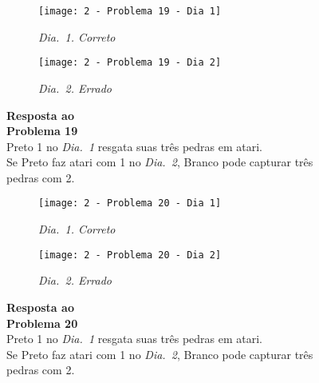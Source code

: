 \begin{SCfigure}[][h!]
    \begin{subfigure}[t]{.31\textwidth}
        \texttt{[image: 2 - Problema 19 - Dia 1]}
        \caption*{\emph{Dia.\@~1. Correto}}
    \end{subfigure}
    \hfill
    \begin{subfigure}[t]{.31\textwidth}
        \texttt{[image: 2 - Problema 19 - Dia 2]}
        \caption*{\emph{Dia.\@~2. Errado}}
    \end{subfigure}
    \hfill
    \caption*{\textbf{Resposta ao\\Problema 19}\\\vspace*{.25cm}Preto 1 no \emph{Dia.\@~1} resgata suas três pedras em atari.\\\vspace*{.25cm}Se Preto faz atari com 1 no \emph{Dia.\@~2}, Branco pode capturar três pedras com 2.}
\end{SCfigure}

\vfill

\begin{SCfigure}[][h!]
    \begin{subfigure}[t]{.31\textwidth}
        \texttt{[image: 2 - Problema 20 - Dia 1]}
        \caption*{\emph{Dia.\@~1. Correto}}
    \end{subfigure}
    \hfill
    \begin{subfigure}[t]{.31\textwidth}
        \texttt{[image: 2 - Problema 20 - Dia 2]}
        \caption*{\emph{Dia.\@~2. Errado}}
    \end{subfigure}
    \hfill
    \caption*{\textbf{Resposta ao\\Problema 20}\\\vspace*{.25cm}Preto 1 no \emph{Dia.\@~1} resgata suas três pedras em atari.\\\vspace*{.25cm}Se Preto faz atari com 1 no \emph{Dia.\@~2}, Branco pode capturar três pedras com 2.}
\end{SCfigure}

\vfill

